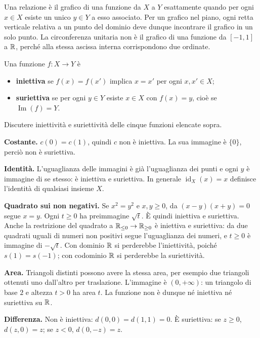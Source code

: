 Una relazione è il grafico di una funzione da $X$ a $Y$ esattamente quando per ogni $x\in X$ esiste un unico $y\in Y$ a esso associato. Per un grafico nel piano, ogni retta verticale relativa a un punto del dominio deve dunque incontrare il grafico in un solo punto. La circonferenza unitaria non è il grafico di una funzione da $[-1,1]$ a $\mathbb{R}$, perché alla stessa ascissa interna corrispondono due ordinate.

\begin{definizione}
Una funzione $f:X\to Y$ è
\begin{itemize}
  \item \textbf{iniettiva} se $f(x)=f(x')$ implica $x=x'$ per ogni $x,x'\in X$;
  \item \textbf{suriettiva} se per ogni $y\in Y$ esiste $x\in X$ con $f(x)=y$, cioè se $\operatorname{Im}(f)=Y$.
\end{itemize}
\end{definizione}

\begin{esercizio}
Discutere iniettività e suriettività delle cinque funzioni elencate sopra.
\end{esercizio}
\begin{svolgimento}
\textbf{Costante.} $c(0)=c(1)$, quindi $c$ non è iniettiva. La sua immagine è $\{0\}$, perciò non è suriettiva.

\textbf{Identità.} L'uguaglianza delle immagini è già l'uguaglianza dei punti e ogni $y$ è immagine di se stesso: è iniettiva e suriettiva. In generale $\operatorname{id}_X(x)=x$ definisce l'identità di qualsiasi insieme $X$.

\textbf{Quadrato sui non negativi.} Se $x^2=y^2$ e $x,y\ge0$, da $(x-y)(x+y)=0$ segue $x=y$. Ogni $t\ge0$ ha preimmagine $\sqrt t$. È quindi iniettiva e suriettiva. Anche la restrizione del quadrato a $\mathbb{R}_{\le0}\to\mathbb{R}_{\ge0}$ è iniettiva e suriettiva: da due quadrati uguali di numeri non positivi segue l'uguaglianza dei numeri, e $t\ge0$ è immagine di $-\sqrt t$. Con dominio $\mathbb{R}$ si perderebbe l'iniettività, poiché $s(1)=s(-1)$; con codominio $\mathbb{R}$ si perderebbe la suriettività.

\textbf{Area.} Triangoli distinti possono avere la stessa area, per esempio due triangoli ottenuti uno dall'altro per traslazione. L'immagine è $(0,+\infty)$: un triangolo di base $2$ e altezza $t>0$ ha area $t$. La funzione non è dunque né iniettiva né suriettiva su $\mathbb{R}$.

\textbf{Differenza.} Non è iniettiva: $d(0,0)=d(1,1)=0$. È suriettiva: se $z\ge0$, $d(z,0)=z$; se $z<0$, $d(0,-z)=z$.
\end{svolgimento}

